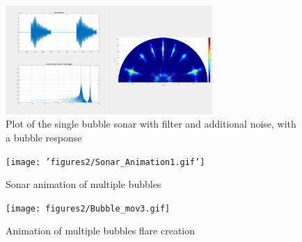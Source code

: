 \documentclass[11pt]{article}
\begin{document}
\begin{figure} [H]
    \centering
    \includegraphics[width=0.7\textwidth]{figures/sonar-addnoise-bubble.png}
    \caption{Plot of the single bubble sonar with filter and additional noise, with a bubble response}
    \label{fig:single-bubble_sonar-addnoise-bubble}
\end{figure}

\begin{figure} [H]
    \centering
    \texttt{[image: 'figures2/Sonar\_Animation1.gif']}
    \caption{Sonar animation of multiple bubbles}
    \label{fig:Sonar_Animation1}
\end{figure}
\begin{figure} [H]
    \centering
    \texttt{[image: figures2/Bubble\_mov3.gif]}
    \caption{Animation of multiple bubbles flare creation}
    \label{fig:Bubble_mov3}
\end{figure}

%
%

\printbibliography
\end{document}
